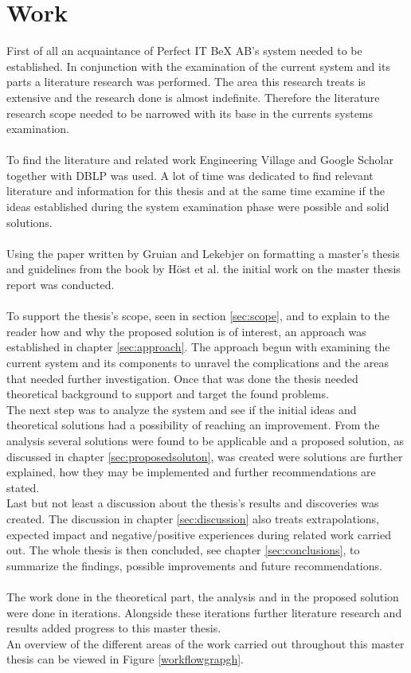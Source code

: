 \documentclass{cslthse-msc}
\begin{document}
\section{Work}
First of all an acquaintance of Perfect IT BeX AB's system needed to be established. In conjunction with the examination of the current system and its parts a literature research was performed. The area this research treats is extensive and the research done is almost indefinite. Therefore the literature research scope needed to be narrowed with its base in the currents systems examination.\\\\    
To find the literature and related work Engineering Village   \cite{Enginvillage} and Google Scholar \cite{Googlescholar} together with DBLP   \cite{DBLP} was used. A lot of time was dedicated to find relevant literature and information for this thesis and at the same time examine if the ideas established during the system examination phase were possible and solid solutions.\\\\
Using the paper written by Gruian and Lekebjer on formatting a master’s thesis   \cite{Reportmall} and guidelines from the book by Höst et al.    \cite{regnell} the initial work on the master thesis report was conducted.\\\\ 
To support the thesis's scope, seen in section \ref{sec:scope}, and to explain to the reader how and why the proposed solution is of interest, an approach was established in chapter \ref{sec:approach}. The approach begun with examining the current system and its components to unravel the complications and the areas that needed further investigation. Once that was done the thesis needed theoretical background to support and target the found problems.\\
The next step was to analyze the system and see if the initial ideas and theoretical solutions had a possibility of reaching an improvement.
From the analysis several solutions were found to be applicable and a proposed solution, as discussed in chapter \ref{sec:proposedsoluton}, was created were solutions are further explained, how they may be implemented and further recommendations are stated.\\
Last but not least a discussion about the thesis's results and discoveries was created. The discussion in chapter \ref{sec:discussion} also treats extrapolations, expected impact and negative/positive experiences during related work carried out.
The whole thesis is then concluded, see chapter \ref{sec:conclusions}, to summarize the findings, possible improvements and future recommendations.\\\\
The work done in the theoretical part, the analysis and in the proposed solution were done in iterations. Alongside these iterations further literature research and results added progress to this master thesis.\\
An overview of the different areas of the work carried out throughout this master thesis can be viewed in Figure \ref{workflowgrapgh}.
\end{document}
